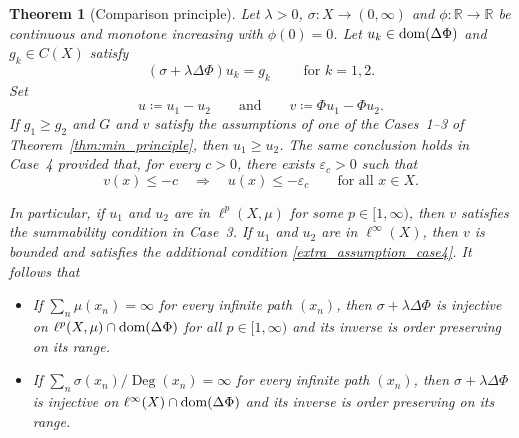 \documentclass[letterpaper]{article}
\newtheorem{theorem}[lemma]{Theorem}
\theoremstyle{definition}
\theoremstyle{named}
\numberwithin{equation}{section}
\newcommand{\R}{\mathbb{R}}
\newcommand{\dom}{\textnormal{dom}} %
\newcommand{\Deg}{\operatorname{Deg}}
\begin{document}
\begin{theorem}[Comparison principle]\label{thm:min}
Let $\lambda>0$, $\sigma \colon X \to (0, \infty)$ and { $\phi\colon\R\to\R$ be continuous and monotone increasing with $\phi(0)=0$}. 
Let $u_k \in \dom(\Delta \Phi)$ and  $g_k \in C(X)$ satisfy
	$$
	\left(\sigma + \lambda\Delta \Phi \right) u_k = g_k \qquad \mbox{ for } k=1,2.
	$$
{ Set
\[
 u\coloneqq u_1-u_2
 \qquad \text{and} \qquad
 v\coloneqq \Phi u_1-\Phi u_2.
\]
If $g_1\geq g_2$ and $G$ and $v$ satisfy the assumptions of one of the Cases~1--3 of
Theorem~\ref{thm:min_principle}, then
$u_1\geq u_2$. The same conclusion holds in Case~4 provided that, for 
every $c>0$, there exists $\varepsilon_c>0$ such that
\begin{equation}\label{extra_assumption_case4}
 v(x)\leq-c
 \quad\Longrightarrow\quad
 u(x)\leq-\varepsilon_c \qquad \text{for all } x \in X.
\end{equation}} 

In particular, if  $u_1$ and  $u_2$ are in $\ell^p(X,\mu)$ for some $p \in [1,\infty)$, then { $v$ satisfies the summability condition in
Case~3}. 
If $u_1$ and $u_2$ are in $\ell^\infty(X)$, { then $v$ is bounded and satisfies
the additional condition \eqref{extra_assumption_case4}}.
It follows that 
\begin{itemize}
\item[\textup{(i)}] If $\sum_n \mu(x_n)=\infty$ for every infinite path $(x_n)$, then
$\sigma + \lambda\Delta \Phi$ is injective on $\ell^p(X,\mu) \cap \dom(\Delta \Phi)$
for all $p\in[1,\infty)$ { and its inverse is order preserving on its range}. 
\item[\textup{(ii)}] If $\sum_{n} \sigma(x_n)/\Deg(x_{n})=\infty$ for every infinite path $(x_n)$,
then $\sigma + \lambda\Delta \Phi$ is injective on
{ $\ell^\infty(X)\cap\dom(\Delta\Phi)$ and its inverse is order preserving on its range}.
\end{itemize}

\end{theorem}
\end{document}
